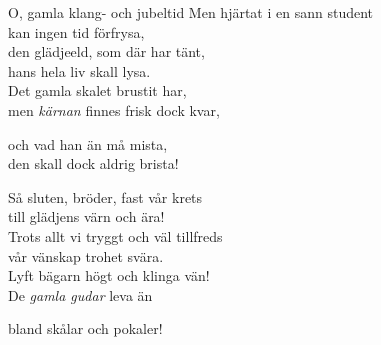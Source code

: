 \begin{song}{O, gamla klang- och jubeltid}
	\showversenumber
	Men hjärtat i en sann student\\
	kan ingen tid förfrysa,\\
	den glädjeeld, som där har tänt,\\
	hans hela liv skall lysa.\\
	Det gamla skalet brustit har,\\
	men \emph{kärnan} finnes frisk dock kvar,\\
	\begin{repetition}
		och vad han än må mista,\\
		den skall dock aldrig brista!
	\end{repetition}
	
	\showversenumber
	Så sluten, bröder, fast vår krets\\
	till glädjens värn och ära!\\
	Trots allt vi tryggt och väl tillfreds\\
	vår vänskap trohet svära.\\
	Lyft bägarn högt och klinga vän!\\
	De \emph{gamla gudar} leva än\\
	\begin{repetition}
		bland skålar och pokaler!
	\end{repetition}
	
\end{song}

